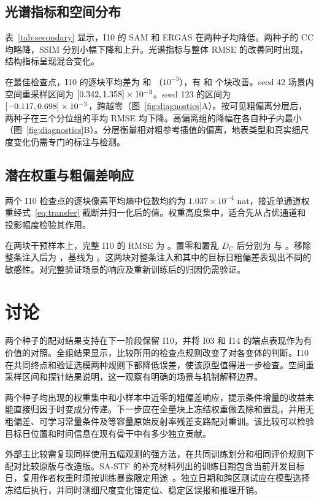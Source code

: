 \documentclass[a4paper,10pt,twocolumn]{article}
\begin{document}
\subsection{光谱指标和空间分布}
表~\ref{tab:secondary} 显示，I10 的 SAM 和 ERGAS 在两种子均降低。两种子的 CC 均略降，SSIM 分别小幅下降和上升。光谱指标与整体 RMSE 的改善同时出现，结构指标呈现混合变化。

在最佳检查点，I10 的逐块平均差为 \MeanPairA{} 和 \MeanPairB{}（$10^{-3}$），有 \BetterPatchesA{} 和 \BetterPatchesB{} 个块改善。seed 42 场景内空间重采样区间为 $[0.342,1.358]\times10^{-3}$。seed 123 的区间为 $[-0.117,0.698]\times10^{-3}$，跨越零（图~\ref{fig:diagnostics}A）。按可见粗偏离分层后，两种子在三个分位组的平均 RMSE 均下降。高偏离组的降幅在各自种子内最小（图~\ref{fig:diagnostics}B）。分层衡量相对粗参考插值的偏离，地表类型和真实细尺度变化仍需专门的标注与检测。

\subsection{潜在权重与粗偏差响应}
两个 I10 检查点的逐块像素平均熵中位数均约为 $1.037\times10^{-4}$ nat，接近单通道权重经式~\eqref{eq:transfer} 截断并归一化后的值。权重高度集中，适合先从占优通道和投影幅度检验其作用。

在两块干预样本上，完整 I10 的 RMSE 为 \ProbeFull{}。置零和置乱 $D_C$ 后分别为 \ProbeZero{} 与 \ProbeShuffle{}。移除整条注入后为 \ProbeNoInjection{}，基线为 \ProbeBase{}。这两块对整条注入和其中的目标日粗偏差表现出不同的敏感性。对完整验证场景的响应及重新训练后的归因仍需验证。

\section{讨论}
两个种子的配对结果支持在下一阶段保留 I10，并将 I03 和 I14 的端点表现作为有价值的对照。全组结果显示，比较所用的检查点规则改变了对各变体的判断。I10 在共同终点和验证选模两种规则下都降低误差，使该原型值得进一步检查。空间重采样区间和探针结果说明，这一观察有明确的场景与机制解释边界。

两个种子均出现的权重集中和小样本中近零的粗偏差响应，提示条件增量的收益未能直接归因于时变成分传递。下一步应在全量块上冻结权重做去除和置乱，并用无粗偏差、可学习常量条件及等容量原始反射率残差支路配对重训。该比较可以检验目标日位置和时间信息在现有骨干中有多少独立贡献。

外部主比较需复现同样使用五幅观测的强方法，在共同训练划分和相同评价规则下配对比较原版与改造版。SA-STF 的补充材料列出的训练日期包含当前开发目标日，复用作者权重时须按训练暴露限定用途~\citep{zhang2026sastf}。独立日期和跨区测试应在模型选择冻结后执行，并同时测细尺度变化错定位、稳定区误报和推理开销。
\end{document}
